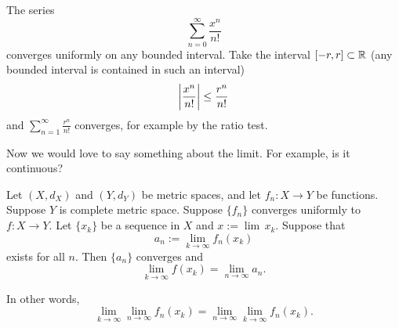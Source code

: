 \begin{example}
The series
\begin{equation*}
\sum_{n=0}^\infty \frac{x^n}{n!} 
\end{equation*}
converges uniformly on any bounded interval.
Take the interval $[-r,r] \subset {\mathbb{R}}$ (any bounded interval
is contained in such an interval)
\begin{equation*}
\left\lvert {\frac{x^n}{n!} } \right\rvert \leq 
\frac{r^n}{n!}
\end{equation*}
and 
$\sum_{n=1}^\infty \frac{r^n}{n!}$ converges, for example by the ratio test.
\end{example}

Now we would love to say something about the limit.  For example, is it
continuous?


\begin{prop} \label{prop:uniformswitch}
Let $(X,d_X)$ and $(Y,d_Y)$ be metric spaces, and let
$f_n \colon X \to Y$ be functions.
Suppose $Y$ is complete metric space.
Suppose $\{ f_n \}$ converges uniformly to $f \colon X \to Y$.  
Let $\{ x_k \}$ be a sequence in $X$ and $x := \lim \, x_k$.  Suppose
that
\begin{equation*}
a_n := \lim_{k \to \infty} f_n(x_k)
\end{equation*}
exists for all $n$.  Then
$\{a_n\}$ converges and 
\begin{equation*}
\lim_{k \to \infty} f(x_k) = \lim_{n\to\infty} a_n .
\end{equation*}
\end{prop}

In other words,
\begin{equation*}
\lim_{k \to \infty} \lim_{n\to\infty} f_n(x_k) =
\lim_{n \to \infty} \lim_{k\to\infty} f_n(x_k) .
\end{equation*}

